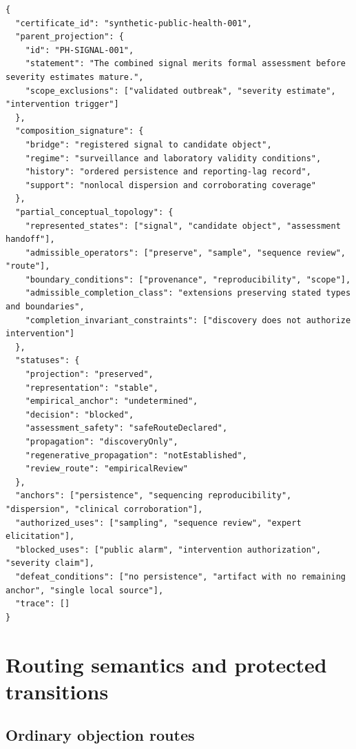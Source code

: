 \documentclass[10pt]{article}
\begin{document}
\begin{lstlisting}
{
  "certificate_id": "synthetic-public-health-001",
  "parent_projection": {
    "id": "PH-SIGNAL-001",
    "statement": "The combined signal merits formal assessment before severity estimates mature.",
    "scope_exclusions": ["validated outbreak", "severity estimate", "intervention trigger"]
  },
  "composition_signature": {
    "bridge": "registered signal to candidate object",
    "regime": "surveillance and laboratory validity conditions",
    "history": "ordered persistence and reporting-lag record",
    "support": "nonlocal dispersion and corroborating coverage"
  },
  "partial_conceptual_topology": {
    "represented_states": ["signal", "candidate object", "assessment handoff"],
    "admissible_operators": ["preserve", "sample", "sequence review", "route"],
    "boundary_conditions": ["provenance", "reproducibility", "scope"],
    "admissible_completion_class": "extensions preserving stated types and boundaries",
    "completion_invariant_constraints": ["discovery does not authorize intervention"]
  },
  "statuses": {
    "projection": "preserved",
    "representation": "stable",
    "empirical_anchor": "undetermined",
    "decision": "blocked",
    "assessment_safety": "safeRouteDeclared",
    "propagation": "discoveryOnly",
    "regenerative_propagation": "notEstablished",
    "review_route": "empiricalReview"
  },
  "anchors": ["persistence", "sequencing reproducibility", "dispersion", "clinical corroboration"],
  "authorized_uses": ["sampling", "sequence review", "expert elicitation"],
  "blocked_uses": ["public alarm", "intervention authorization", "severity claim"],
  "defeat_conditions": ["no persistence", "artifact with no remaining anchor", "single local source"],
  "trace": []
}
\end{lstlisting}

\section{Routing semantics and protected transitions}
\label{sec:routing}

\subsection{Ordinary objection routes}
\end{document}
